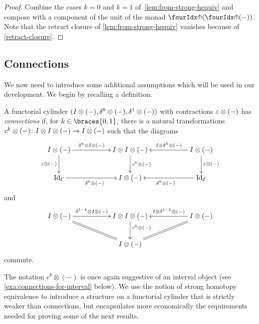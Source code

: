 \documentclass[reqno,10pt,a4paper,oneside,draft]{amsart}
\begin{document}
\begin{proof} Combine the cases $k = 0$ and $k = 1$ of~\cref{lem:from-strong-hequiv} and compose with a component of the unit of the monad $\liftl{(\liftr{(-)})}$.
Note that the retract closure of \cref{lem:from-strong-hequiv} vanishes because of \cref{retract-closure}.
\end{proof}

\subsection*{Connections}

We now need to introduce some additional assumptions which will be used in our development.
We begin by recalling a definition.

\begin{definition} \label{def:connections}
A functorial cylinder $(I \otimes (-), \delta^0 \otimes (-), \delta^1 \otimes (-))$ with contractions $\varepsilon \otimes (-)$ has \emph{connections} if, for $k \in \braces{0, 1}$, there is a natural transformations $c^k \otimes (-) \colon I \otimes I \otimes (-) \to I \otimes (-)$ such that the diagrams
\begin{equation} \label{connections:0}
\xymatrix@C+3em{
  \interval \otimes (-)
  \ar[r]^-{\kcyl \otimes \interval \otimes (-)}
  \ar[d]_{\ccyl \otimes (-)}
&
  \interval \otimes \interval \otimes (-)
  \ar[d]^{c^k \otimes (-)}
&
  \interval \otimes (-)
  \ar[l]_-{\interval \otimes \kcyl \otimes (-)}
  \ar[d]^{\ccyl \otimes (-)}
\\
  \Id_\catE
  \ar[r]_{\kcyl \otimes (-)}
&
  \interval \otimes (-)
&
  \Id_\catE
  \ar[l]^{\kcyl \otimes (-)}
}
\end{equation}
and
\begin{equation} \label{connections:1}
\xymatrix@C+3em{
  \interval \otimes (-)
  \ar[r]^-{\kcylinv \otimes \interval \otimes (-)}
  \ar@{=}[dr]
&
  \interval \otimes \interval \otimes (-)
  \ar[d]^(0.4){c^k \otimes (-)}
&
  \interval \otimes (-)
  \ar[l]_-{\interval \otimes \kcylinv \otimes (-)}
  \ar@{=}[dl]
\\&
  \interval \otimes (-)
}
\end{equation}
commute.
\end{definition}

The notation $c^k \otimes (-)$ is once again suggestive of an interval object (see \cref{exa:connections-for-interval} below).
We use the notion of strong homotopy equivalence to introduce a structure on a functorial cylinder that is strictly weaker than connections, but encapsulates more economically the requirements needed for proving some of the next results.
\end{document}
